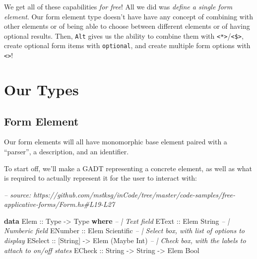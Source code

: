 \documentclass[]{article}
\newenvironment{Shaded}{}{}
\newcommand{\CommentTok}[1]{\textcolor[rgb]{0.38,0.63,0.69}{\textit{#1}}}
\newcommand{\DataTypeTok}[1]{\textcolor[rgb]{0.56,0.13,0.00}{#1}}
\newcommand{\KeywordTok}[1]{\textcolor[rgb]{0.00,0.44,0.13}{\textbf{#1}}}
\newcommand{\NormalTok}[1]{#1}
\newcommand{\OtherTok}[1]{\textcolor[rgb]{0.00,0.44,0.13}{#1}}
\begin{document}
We get all of these capabilities \emph{for free}! All we did was \emph{define a
single form element}. Our form element type doesn't have have any concept of
combining with other elements or of being able to choose between different
elements or of having optional results. Then, \texttt{Alt} gives us the ability
to combine them with
\texttt{\textless{}*\textgreater{}}/\texttt{\textless{}\$\textgreater{}}, create
optional form items with \texttt{optional}, and create multiple form options
with \texttt{\textless{}\textbar{}\textgreater{}}!

\hypertarget{our-types}{%
\section{Our Types}\label{our-types}}

\hypertarget{form-element}{%
\subsection{Form Element}\label{form-element}}

Our form elements will all have monomorphic base element paired with a
``parser'', a description, and an identifier.

To start off, we'll make a GADT representing a concrete element, as well as what
is required to actually represent it for the user to interact with:

\begin{Shaded}
\begin{Highlighting}[]
\CommentTok{-- source: https://github.com/mstksg/inCode/tree/master/code-samples/free-applicative-forms/Form.hs#L19-L27}

\KeywordTok{data} \DataTypeTok{Elem}\OtherTok{ ::} \DataTypeTok{Type} \OtherTok{->} \DataTypeTok{Type} \KeywordTok{where}
    \CommentTok{-- | Text field}
    \DataTypeTok{EText}\OtherTok{   ::} \DataTypeTok{Elem} \DataTypeTok{String}
    \CommentTok{-- | Numberic field}
    \DataTypeTok{ENumber}\OtherTok{ ::} \DataTypeTok{Elem} \DataTypeTok{Scientific}
    \CommentTok{-- | Select box, with list of options to display}
    \DataTypeTok{ESelect}\OtherTok{ ::}\NormalTok{ [}\DataTypeTok{String}\NormalTok{] }\OtherTok{->} \DataTypeTok{Elem}\NormalTok{ (}\DataTypeTok{Maybe} \DataTypeTok{Int}\NormalTok{)}
    \CommentTok{-- | Check box, with the labels to attach to on/off states}
    \DataTypeTok{ECheck}\OtherTok{  ::} \DataTypeTok{String} \OtherTok{->} \DataTypeTok{String} \OtherTok{->} \DataTypeTok{Elem} \DataTypeTok{Bool}
\end{Highlighting}
\end{Shaded}
\end{document}
